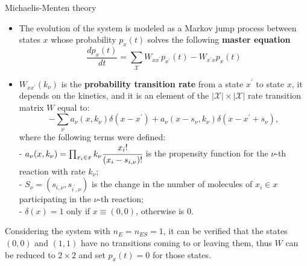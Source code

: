 \documentclass[final]{beamer}
\newlength{\colwidth}
\begin{document}
\begin{frame}[t]
\begin{columns}[t]
\begin{column}{\colwidth}
\begin{block}{Michaelis-Menten theory}
\begin{itemize}
\justifying
\item The evolution of the system is modeled as a Markov jump process between states $x$ whose probability $p_x(t)$ solves the following {\bf master equation}\cite{van2007stochastic,GILLESPIE1976403}
%
\begin{equation}
\frac{dp_{x}(t)}{dt} = \sum_{\mathcal{X}} W_{xx^\prime} p_{x^\prime}(t) -  W_{x^\prime x}p_{x}(t) \label{eq CME}
\end{equation}
\item $W_{x x^\prime }(k_\nu)$ is the {\bf probability transition rate} from a state $x^\prime$ to state $x$, it depends on the kinetics, and it is an element of the $|\mathcal{X}|\times|\mathcal{X}|$ rate transition matrix $W$ equal to\cite{Munsky_2006}:
\begin{equation*}
-\sum_\nu a_\nu({x},k_\nu) \delta(x - x^\prime) + a_\nu({x} - s_\nu,k_\nu) \delta(x - x^\prime + s_\nu),
\end{equation*}
\vskip-20pt
where the following terms were defined:\\

- $a_\nu({x},k_\nu) = \prod_{x_i \in x} k_\nu \cfrac{{x_i}!}{({x}_{i} - s_{i,\nu})!}$ is the propensity function for the $\nu$-th reaction with rate $k_\nu$;\\

- $S_\nu = (s_{i,\nu},s_{i^\prime,\nu})$ is the change in the number of molecules of $x_i \in x$ participating in the $\nu$-th reaction;\\
- $\delta(x) = 1$ only if $x \equiv (0,0)$, otherwise is $0$.
%
\end{itemize}
%

Considering the system with $n_E=n_{ES}=1$, it can be verified that the states $(0,0)$ and $(1,1)$ have no transitions coming to or leaving them, thus $W$ can be reduced to $2 \times 2$ and set $p_x(t) = 0$ for those states. 
\end{block}



\end{column}


\end{columns}
\end{frame}
\end{document}
